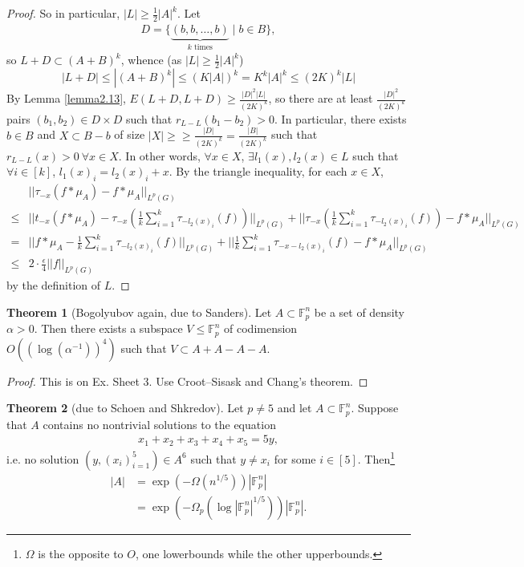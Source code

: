 \documentclass{article}
\theoremstyle{definition}
\newtheorem{theorem}{Theorem}[section]
\begin{document}
\begin{proof}
    So in particular, $\left|L\right|\ge \frac{1}{2}\left|A\right|^k$. Let
    \begin{align*}
        D = \{\underbrace{(b,b,\ldots,b)}_{k \text{ times}} \mid b \in B\},
    \end{align*}
    so $L + D \subset (A+B)^k$, whence (as $\left|L\right|\ge \frac{1}{2}\left|A\right|^k$) $$\left|L+D\right|\le \left|(A+B)^k\right|\le (K\left|A\right|)^k = K^k \left|A\right|^k \le (2K)^k \left|L\right|$$
    By Lemma \ref{lemma2.13}, $E(L+D,L+D) \ge \frac{\left|D\right|^2\left|L\right|}{(2K)^k}$, so there are at least $\frac{\left|D\right|^2}{(2K)^k}$ pairs $(b_1,b_2) \in D \times D$ such that $r_{L-L}(b_1-b_2) > 0$. In particular, there exists $b \in B$ and $X \subset B-b$ of size $\left|X\right|\ge \ge \frac{\left|D\right|}{(2K)^k} = \frac{\left|B\right|}{(2K)^k}$ such that $r_{L-L}(x) > 0 ~\forall x \in X$. In other words, $\forall x \in X$, $\exists l_1(x),l_2(x) \in L$ such that $\forall i \in [k]$, $l_1(x)_i = l_2(x)_i + x$. By the triangle inequality, for each $x \in X$, 
    \begin{align*}
        &||\tau_{-x}(f * \mu_A) - f * \mu_A||_{L^p(G)}\\
        \le & ||t_{-x}(f*\mu_A)-\tau_{-x}\left(\frac{1}{k}\sum_{i=1}^{k}\tau_{-l_2(x)_i}(f)\right)||_{L^p(G)} + ||\tau_{-x}\left(\frac{1}{k}\sum_{i=1}^{k}\tau_{-l_2(x)_i}(f)\right)-f* \mu_A||_{L^p(G)}\\
        =& ||f * \mu_A - \frac{1}{k}\sum_{i=1}^{k} \tau_{-l_2(x)_i}(f)||_{L^p(G)} + ||\frac{1}{k}\sum_{i=1}^{k} \tau_{-x-l_2(x)_i}(f)-f*\mu_A||_{L^p(G)}\\
        \le& 2 \cdot \frac{\epsilon}{4} ||f||_{L^p(G)}
    \end{align*}
    by the definition of $L$.
\end{proof}
\begin{theorem}[Bogolyubov again, due to Sanders]\label{theorem3.9}
    Let $A \subset \mathbb{F}_p^n$ be a set of density $\alpha>0$. Then there exists a subspace $V \le \mathbb{F}_p^n$ of codimension $O((\log(\alpha^{-1}))^4)$ such that $V \subset A+A-A-A$.
\end{theorem}
\begin{proof}
    This is on Ex. Sheet 3. Use Croot--Sisask and Chang's theorem.
\end{proof}
\begin{theorem}[due to Schoen and Shkredov]\label{theorem3.10}
    Let $p \neq 5$ and let $A \subset \mathbb{F}_p^n$. Suppose that $A$ contains no nontrivial solutions to the equation 
    \begin{align*}
        x_1 + x_2 + x_3 + x_4 + x_5 = 5y,
    \end{align*}
    i.e. no solution $(y,(x_i)_{i=1}^5) \in A^6$ such that $y \neq x_i$ for some $i \in [5]$. Then\footnote{$\Omega$ is the opposite to $O$, one lowerbounds while the other upperbounds.}
    \begin{align*}
        \left|A\right| &= \exp \left(-\Omega \left(n^{1/5}\right)\right)\left|\mathbb{F}_p^n\right| \\
        &= \exp (-\Omega_p (\log \left|\mathbb{F}_p^n\right|^{1/5}))\left|\mathbb{F}_p^n\right|.
    \end{align*}
\end{theorem}
\end{document}
